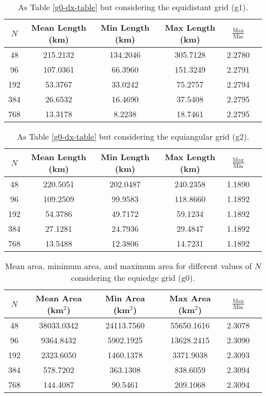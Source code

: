 \begin{table}[htbp]
    \centering
    \caption{As Table \ref{g0-dx-table} but considering the equidistant grid (g1). \label{g1-dx-table}}
    \begin{tabular}{cccccc}
        \toprule
        $N$ & Mean Length (km) & Min Length (km) & Max Length (km) & $\frac{\text{Max}}{\text{Min}}$ \\
        \midrule
        48 & 215.2132 & 134.2046 & 305.7128 & 2.2780 \\
        96 & 107.0361 & 66.3960 & 151.3249 & 2.2791 \\
        192 & 53.3767 & 33.0242 & 75.2757 & 2.2794 \\
        384 & 26.6532 & 16.4690 & 37.5408 & 2.2795 \\
        768 & 13.3178 & 8.2238 & 18.7461 & 2.2795 \\
        \bottomrule
    \end{tabular}
\end{table}

\begin{table}[htbp]
    \centering
    \caption{As Table \ref{g0-dx-table} but considering the equiangular grid (g2). \label{g2-dx-table}}
    \begin{tabular}{cccccc}
        \toprule
        $N$ & Mean Length (km) & Min Length (km) & Max Length (km) & $\frac{\text{Max}}{\text{Min}}$ \\
        \midrule
        48 & 220.5051 & 202.0487 & 240.2358 & 1.1890 \\
        96 & 109.2509 & 99.9583 & 118.8660 & 1.1892 \\
        192 & 54.3786 & 49.7172 & 59.1234 & 1.1892 \\
        384 & 27.1281 & 24.7936 & 29.4847 & 1.1892 \\
        768 & 13.5488 & 12.3806 & 14.7231 & 1.1892 \\
        \bottomrule
    \end{tabular}
\end{table}

\begin{table}[htbp]
    \centering
    \caption{Mean area, minimum area, and maximum area for different values of $N$ considering the equiedge grid (g0).\label{g0-da-table}}
    \begin{tabular}{cccccc}
        \toprule
        $N$ & Mean Area (km$^2$) & Min Area (km$^2$) & Max Area (km$^2$) & $\frac{\text{Max}}{\text{Min}}$ \\
        \midrule
        48 & 38033.0342 & 24113.7560 & 55650.1616 & 2.3078 \\
        96 & 9364.8432 & 5902.1925 & 13628.2415 & 2.3090 \\
        192 & 2323.6050 & 1460.1378 & 3371.9038 & 2.3093 \\
        384 & 578.7202 & 363.1308 & 838.6059 & 2.3094 \\
        768 & 144.4087 & 90.5461 & 209.1068 & 2.3094 \\
        \bottomrule
    \end{tabular}
\end{table}

